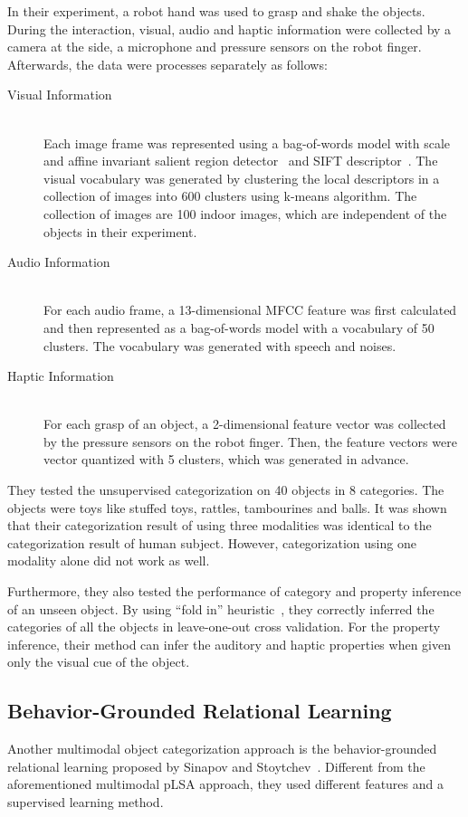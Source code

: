 \documentclass[12pt,final,twoside]{report}
\begin{document}
In their experiment, a robot hand was used to grasp and shake the objects. During the interaction, visual, audio and haptic information were collected by a camera at the side, a microphone and pressure sensors on the robot finger. Afterwards, the data were processes separately as follows:
\begin{description}
  \item[Visual Information] \hfill \\
    Each image frame was represented using a bag-of-words model with scale and affine invariant salient region detector~\cite{mikolajczyk_scale_2004} and SIFT descriptor~\cite{lowe_distinctive_2004}. The visual vocabulary was generated by clustering the local descriptors in a collection of images into 600 clusters using k-means algorithm. The collection of images are 100 indoor images, which are independent of the objects in their experiment.
  \item[Audio Information] \hfill \\
    For each audio frame, a 13-dimensional MFCC feature was first calculated and then represented as a bag-of-words model with a vocabulary of 50 clusters. The vocabulary was generated with speech and noises.
  \item[Haptic Information] \hfill \\
    For each grasp of an object, a 2-dimensional feature vector was collected by the pressure sensors on the robot finger. Then, the feature vectors were vector quantized with 5 clusters, which was generated in advance.
\end{description}

They tested the unsupervised categorization on 40 objects in 8 categories. The objects were toys like stuffed toys, rattles, tambourines and balls. It was shown that their categorization result of using three modalities was identical to the categorization result of human subject. However, categorization using one modality alone did not work as well.

Furthermore, they also tested the performance of category and property inference of an unseen object. By using ``fold in'' heuristic~\cite{hofmann_probabilistic_1999}, they correctly inferred the categories of all the objects in leave-one-out cross validation. For the property inference, their method can infer the auditory and haptic properties when given only the visual cue of the object.

\subsection{Behavior-Grounded Relational Learning}
Another multimodal object categorization approach is the behavior-grounded relational learning proposed by Sinapov and Stoytchev~\cite{sinapov_object_2011}. Different from the aforementioned multimodal pLSA approach, they used different features and a supervised learning method.
\end{document}
